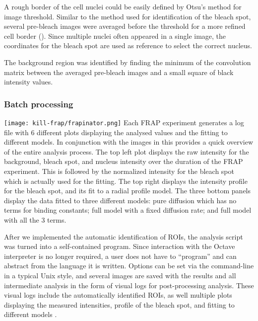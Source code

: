       A rough border of the cell nuclei could be easily defined by
      Otsu's method for image threshold. Similar to the method used
      for identification of the bleach spot, several pre-bleach images
      were averaged before the threshold for a more refined cell border ().
      Since multiple nuclei often appeared in a single image,
      the coordinates for the bleach spot are used as reference to select
      the correct nucleus.

      The background region was identified by finding the minimum of
      the convolution matrix between the averaged pre-bleach images and
      a small square of black intensity values.

    \subsubsection{Batch processing}

      \begin{sidewaysfigure}
        \texttt{[image: kill-frap/frapinator.png]}
          {
            Each FRAP experiment generates a log file with 6 different plots
            displaying the analysed values and the fitting to different models.
            In conjunction with the images in  this
            provides a quick overview of the entire analysis process.
            The top left plot displays the raw intensity
            for the background, bleach spot, and nucleus intensity over the
            duration of the FRAP experiment. This is followed by the normalized
            intensity for the bleach spot which is actually used for the
            fitting. The top right displays the intensity
            profile for the bleach spot, and its fit to a radial profile
            model. The three bottom panels display the data fitted to three
            different models: pure diffusion which has no terms for binding
            constants; full model with a fixed diffusion rate; and full model
            with all the 3 terms.
          }
        \label{fig:kill-frap:frapinator}
      \end{sidewaysfigure}

      After we implemented the automatic identification of ROIs, the
      analysis script was turned into a self-contained %
      program. Since interaction with the Octave interpreter is no
      longer required, a user does not have to ``program'' and can
      abstract from the language it is written. Options can be set via
      the command-line in a typical Unix style, and
      several images are saved with the results and all intermediate analysis
      in the form of visual logs for post-processing analysis.
      These visual logs include the automatically identified ROIs,
      as well multiple plots displaying the measured
      intensities, profile of the bleach spot, and fitting
      to different models .

